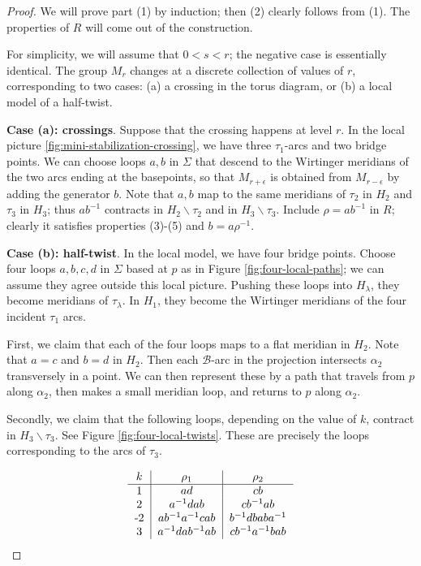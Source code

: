 \documentclass[11pt]{amsart}
\theoremstyle{definition}
\theoremstyle{remark}
\numberwithin{equation}{section}
\newcommand{\cB}{\mathcal{B}}
\begin{document}
\begin{proof}
We will prove part (1) by induction; then (2) clearly follows from (1). The properties of $R$ will come out of the construction.

For simplicity, we will assume that $0 < s < r$; the negative case is essentially identical. The group $M_r$ changes at a discrete collection of values of $r$, corresponding to two cases: (a) a crossing in the torus diagram, or (b) a local model of a half-twist.

{\bf Case (a): crossings}. Suppose that the crossing happens at level $r$. In the local picture \ref{fig:mini-stabilization-crossing}, we have three $\tau_1$-arcs and two bridge points.  We can choose loops $a,b$ in $\Sigma$ that descend to the Wirtinger meridians of the two arcs ending at the basepoints, so that $M_{r + \epsilon}$ is obtained from $M_{r - \epsilon}$ by adding the generator $b$.  Note that $a,b$ map to the same meridians of $\tau_{2}$ in $H_2$ and $\tau_3$ in $H_3$; thus $ab^{-1}$ contracts in $H_2 \smallsetminus \tau_2$ and in $H_3 \smallsetminus \tau_3$.  Include $\rho = ab^{-1}$ in $R$; clearly it satisfies properties (3)-(5) and $b = a \rho^{-1}$.

{\bf Case (b): half-twist}. In the local model, we have four bridge points. Choose four loops $a,b,c,d$ in $\Sigma$ based at $p$ as in Figure \ref{fig:four-local-paths}; we can assume they agree outside this local picture.  Pushing these loops into $H_{\lambda}$, they become meridians of $\tau_{\lambda}$. In $H_1$, they become the Wirtinger meridians of the four incident $\tau_1$ arcs.

First, we claim that each of the four loops maps to a flat meridian in $H_2$. Note that $a = c$ and $b = d$ in $H_2$. Then each $\cB$-arc in the projection intersects $\alpha_2$ transversely in a point. We can then represent these by a path that travels from $p$ along $\alpha_2$, then makes a small meridian loop, and returns to $p$ along $\alpha_2$.

Secondly, we claim that the following loops, depending on the value of $k$, contract in $H_3 \smallsetminus \tau_3$. See Figure \ref{fig:four-local-twists}. These are precisely the loops corresponding to the arcs of $\tau_3$.

\[
\begin{tabular}{c | c | c}
$k$ & $\rho_1$ & $\rho_2$ \\
\hline
1 & $ad$ & $cb$ \\
2 & $a^{-1}dab$ &$ cb^{-1}ab$\\
-2 & $ab^{-1}a^{-1}cab$ & $b^{-1}dbaba^{-1}$ \\
3 & $a^{-1}dab^{-1}ab$ &  $cb^{-1}a^{-1}bab$
\end{tabular}
\]


\end{proof}
\end{document}
